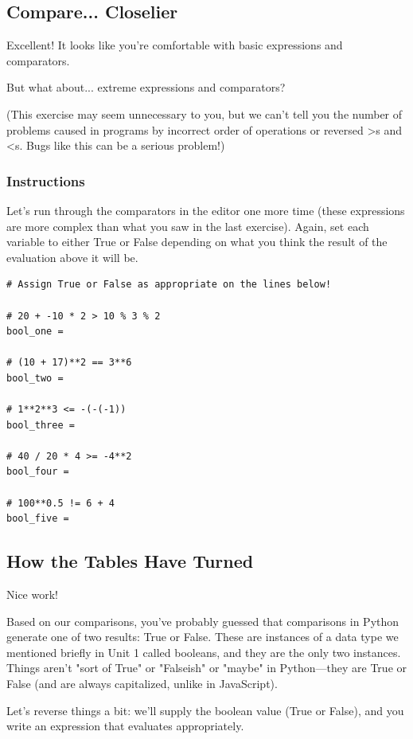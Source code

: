 \documentclass[12pt,a4paper,final,twoside,onecolumn,titlepage]{book}
\begin{document}
\subsection{Compare... Closelier}

Excellent! It looks like you're comfortable with basic expressions and comparators.

But what about... extreme expressions and comparators?

(This exercise may seem unnecessary to you, but we can't tell you the number of problems caused in programs by incorrect order of operations or reversed >s and <s. Bugs like this can be a serious problem!)

\subsubsection{Instructions}

Let's run through the comparators in the editor one more time (these expressions are more complex than what you saw in the last exercise). Again, set each variable to either True or False depending on what you think the result of the evaluation above it will be.

\begin{lstlisting}
# Assign True or False as appropriate on the lines below!

# 20 + -10 * 2 > 10 % 3 % 2
bool_one = 

# (10 + 17)**2 == 3**6
bool_two = 

# 1**2**3 <= -(-(-1))
bool_three = 

# 40 / 20 * 4 >= -4**2
bool_four = 

# 100**0.5 != 6 + 4
bool_five = 
\end{lstlisting}

\subsection{How the Tables Have Turned}

Nice work!

Based on our comparisons, you've probably guessed that comparisons in Python generate one of two results: True or False. These are instances of a data type we mentioned briefly in Unit 1 called booleans, and they are the only two instances. Things aren't "sort of True" or "Falseish" or "maybe" in Python—they are True or False (and are always capitalized, unlike in JavaScript).

Let's reverse things a bit: we'll supply the boolean value (True or False), and you write an expression that evaluates appropriately.
\end{document}
